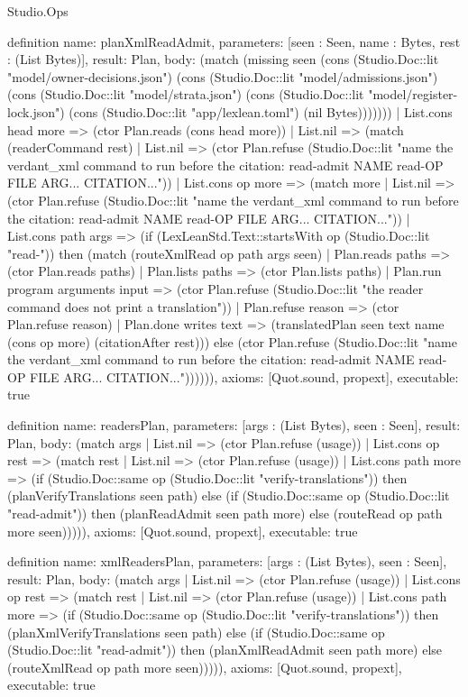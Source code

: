 \begin{lexlean}{Studio.Ops}
\begin{semanticmodule}
{definition{
  name: planXmlReadAdmit,
  parameters: [seen : Seen, name : Bytes, rest : (List Bytes)],
  result: Plan,
  body: (match (missing seen (cons (Studio.Doc::lit "model/owner-decisions.json") (cons (Studio.Doc::lit "model/admissions.json") (cons (Studio.Doc::lit "model/strata.json") (cons (Studio.Doc::lit "model/register-lock.json") (cons (Studio.Doc::lit "app/lexlean.toml") (nil Bytes)))))))
    | List.cons head more => (ctor Plan.reads (cons head more))
    | List.nil => (match (readerCommand rest)
      | List.nil => (ctor Plan.refuse (Studio.Doc::lit "name the verdant_xml command to run before the citation: read-admit NAME read-OP FILE ARG... CITATION...\n"))
      | List.cons op more => (match more
        | List.nil => (ctor Plan.refuse (Studio.Doc::lit "name the verdant_xml command to run before the citation: read-admit NAME read-OP FILE ARG... CITATION...\n"))
        | List.cons path args => (if (LexLeanStd.Text::startsWith op (Studio.Doc::lit "read-")) then (match (routeXmlRead op path args seen)
          | Plan.reads paths => (ctor Plan.reads paths)
          | Plan.lists paths => (ctor Plan.lists paths)
          | Plan.run program arguments input => (ctor Plan.refuse (Studio.Doc::lit "the reader command does not print a translation\n"))
          | Plan.refuse reason => (ctor Plan.refuse reason)
          | Plan.done writes text => (translatedPlan seen text name (cons op more) (citationAfter rest))) else (ctor Plan.refuse (Studio.Doc::lit "name the verdant_xml command to run before the citation: read-admit NAME read-OP FILE ARG... CITATION...\n")))))),
  axioms: [Quot.sound, propext],
  executable: true
}

definition{
  name: readersPlan,
  parameters: [args : (List Bytes), seen : Seen],
  result: Plan,
  body: (match args
    | List.nil => (ctor Plan.refuse (usage))
    | List.cons op rest => (match rest
      | List.nil => (ctor Plan.refuse (usage))
      | List.cons path more => (if (Studio.Doc::same op (Studio.Doc::lit "verify-translations")) then (planVerifyTranslations seen path) else (if (Studio.Doc::same op (Studio.Doc::lit "read-admit")) then (planReadAdmit seen path more) else (routeRead op path more seen))))),
  axioms: [Quot.sound, propext],
  executable: true
}

definition{
  name: xmlReadersPlan,
  parameters: [args : (List Bytes), seen : Seen],
  result: Plan,
  body: (match args
    | List.nil => (ctor Plan.refuse (usage))
    | List.cons op rest => (match rest
      | List.nil => (ctor Plan.refuse (usage))
      | List.cons path more => (if (Studio.Doc::same op (Studio.Doc::lit "verify-translations")) then (planXmlVerifyTranslations seen path) else (if (Studio.Doc::same op (Studio.Doc::lit "read-admit")) then (planXmlReadAdmit seen path more) else (routeXmlRead op path more seen))))),
  axioms: [Quot.sound, propext],
  executable: true
}

}
\end{semanticmodule}
\end{lexlean}
